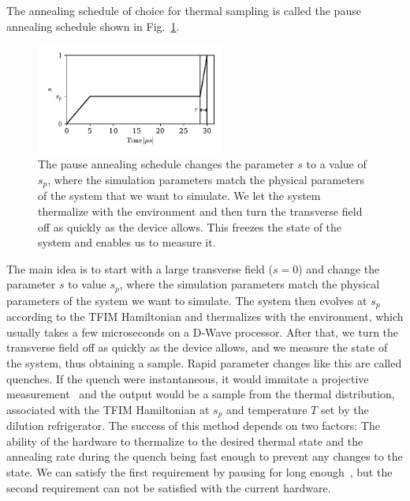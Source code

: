 \documentclass[12pt,a4paper]{article}
\begin{document}
\hspace*{0.3cm}
The annealing schedule of choice for thermal sampling is called the pause annealing schedule
shown in Fig.~\ref{fig:pause_anneal_schedule}.
\begin{figure}[!htb]
    \vspace*{-0.2cm}
    \centering
    \includegraphics[width=0.55\textwidth]{../plots/pause_schedule.pdf}
    \captionsetup{width=0.9\textwidth}
    \vspace*{-0.4cm}
    \caption{The pause annealing schedule changes the parameter $s$ to a value of $s_p$,
    where the simulation parameters match the physical parameters of the system that we want to simulate. We let the
    system thermalize with the environment and then turn the transverse field off as quickly as the device
    allows. This freezes the state of the system and enables us to measure it.}
    \vspace*{-0.3cm}
    \label{fig:pause_anneal_schedule}
\end{figure}
The main idea is to start with a large transverse field ($s = 0$) and change the parameter $s$ to value $s_p$,
where the simulation parameters match the physical parameters of the system we want to simulate.
The system then evolves at $s_p$ according to the TFIM Hamiltonian and thermalizes with the environment,
which usually takes a few microseconds on a D-Wave processor. After that, we turn the transverse field off as quickly
as the device allows, and we measure the state of the system, thus obtaining a sample. Rapid parameter changes
like this are called quenches. If the quench were instantaneous, it would immitate a projective measurement~\cite*{king2021scaling} and
the output would be a sample from the thermal distribution, associated with the TFIM Hamiltonian at $s_p$ and
temperature $T$ set by the dilution refrigerator. The success of this method depends on two factors:
The ability of the hardware to thermalize to the desired thermal state and the annealing rate during
the quench being fast enough to prevent any changes to the state. We can satisfy the first requirement
by pausing for long enough~\cite*{venuti2016adiabaticity}, but the second requirement can not be satisfied with the current hardware.
\end{document}

